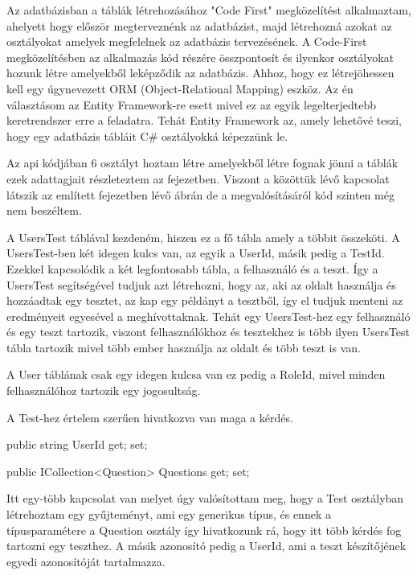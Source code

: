 




Az adatbázisban a táblák létrehozásához "Code First" megközelítést alkalmaztam, ahelyett hogy először megterveznénk az adatbázist, majd létrehozná azokat az osztályokat amelyek megfelelnek az adatbázis tervezésének. A Code-First megközelítésben az alkalmazás kód részére összpontosít és ilyenkor osztályokat hozunk létre amelyekből leképződik az adatbázis. Ahhoz, hogy ez létrejöhessen kell egy úgynevezett ORM (Object-Relational Mapping) eszköz. Az én választásom az Entity Framework-re esett mivel ez az egyik legelterjedtebb keretrendszer erre a feladatra. Tehát Entity Framework az, amely lehetővé teszi, hogy egy adatbázis tábláit C\# osztályokká képezzünk le. \newline

Az api kódjában 6 osztályt hoztam létre amelyekből létre fognak jönni a táblák ezek adattagjait részleteztem az  fejezetben.
Viszont a közöttük lévő kapcsolat látszik az említett fejezetben lévő ábrán de a megvalósításáról kód szinten még nem beszéltem. \newline

A UsersTest táblával kezdeném, hiszen ez a fő tábla amely a többit összeköti.
A UsersTest-ben két idegen kulcs van, az egyik a UserId, másik pedig a TestId. Ezekkel kapcsolódik a két legfontosabb tábla, a felhasználó és a teszt. Így a UsersTest segítségével tudjuk azt létrehozni, hogy az, aki az oldalt használja és hozzáadtak egy tesztet, az kap egy példányt a tesztből, így el tudjuk menteni az eredményeit egyesével a meghívottaknak.
Tehát egy UsersTest-hez egy felhasználó és egy teszt tartozik, viszont felhasználókhoz és tesztekhez is több ilyen UsersTest tábla tartozik mivel több ember használja az oldalt és több teszt is van. \newline

A User táblának csak egy idegen kulcsa van ez pedig a RoleId, mivel minden felhasználóhoz tartozik egy jogosultság.\newline


A Test-hez értelem szerűen hivatkozva van maga a kérdés.
\begin{cpp}
    public string UserId { get; set; }

    public ICollection<Question> Questions { get; set; }
\end{cpp}
Itt egy-több kapcsolat van melyet úgy valósítottam meg, hogy a Test osztályban létrehoztam egy gyűjteményt, ami egy generikus típus, és ennek a típusparamétere a Question osztály így hivatkozunk rá, hogy itt több kérdés fog tartozni egy teszthez. A másik azonosító pedig a UserId, ami a teszt készítőjének egyedi azonosítóját tartalmazza. \newline

